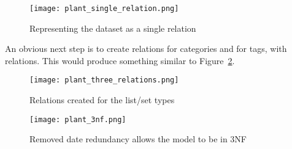\documentclass[11pt,a4paper]{article}
\begin{document}
\begin{comment}
  @startuml plant_single_relation.png
  class Programme {
    pid
    start_time
    end_time
    epoch_start
    epoch_end
    complete_title
    media_type
    masterbrand
    service
    brand_pid
    is_clip
    categories
    tags
  }
  @enduml
\end{comment}
\begin{figure}[h]
  \begin{center}
    \texttt{[image: plant\_single\_relation.png]}
  \end{center}
  \caption{Representing the dataset as a single relation}
  \label{fig:single-relation}
\end{figure}

An obvious next step is to create relations for categories and for tags,
with relations. This would produce something similar to
Figure~\ref{fig:cat-tags-rel}.

\begin{comment}
  @startuml plant_three_relations.png
  class Programme {
    pid
    start_time
    end_time
    epoch_start
    epoch_end
    complete_title
    media_type
    masterbrand
    service
    brand_pid
    is_clip
  }
  class Category {
    id
    level
    title
  }
  class Tag {
    title
  }
  Programme "0..*" -r- "0..*" Category
  Programme "0..*" -l- "0..*" Tag
  @enduml
\end{comment}
\begin{figure}[p]
  \begin{center}
    \texttt{[image: plant\_three\_relations.png]}
  \end{center}
  \caption{Relations created for the list/set types}
  \label{fig:cat-tags-rel}
\end{figure}

\begin{comment}
  @startuml plant_3nf.png
  class Programme {
    pid : varchar
    complete_title : varchar
    media_type : enum ('video, 'audio')
    masterbrand : varchar
    brand_pid : varchar
    is_clip : boolean
  }
  class AvailabilityWindow {
    start_time : timestamp
    end_time : timestamp
    service : varchar
  }
  class Category {
    id : varchar
    level : smallint
    title : varchar
  }
  class Tag {
    title : varchar
  }
  Programme "1" -d- "0..*" AvailabilityWindow
  Programme "0..*" -r- "0..*" Category
  Programme "0..*" -l- "0..*" Tag
  @enduml
\end{comment}
\begin{figure}[p]
  \begin{center}
    \texttt{[image: plant\_3nf.png]}
  \end{center}
  \caption{Removed date redundancy allows the model to be in 3NF}
  \label{fig:3nf}
\end{figure}
\end{document}
